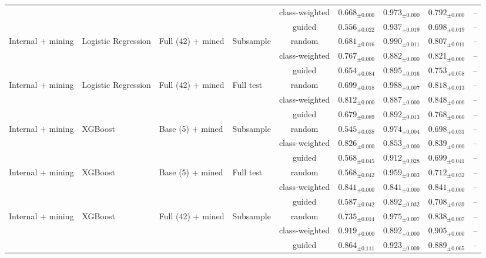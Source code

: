 \begin{longtable}{llllcccc}
 &  &  &  & class-weighted & $0.668_{\pm 0.000}$ & $0.973_{\pm 0.000}$ & $0.792_{\pm 0.000}$ & -- \\
 &  &  &  & guided & $0.556_{\pm 0.022}$ & $0.937_{\pm 0.019}$ & $0.698_{\pm 0.019}$ & -- \\
\addlinespace
Internal + mining & Logistic Regression & Full (42) + mined & Subsample & random & $0.681_{\pm 0.016}$ & $0.990_{\pm 0.011}$ & $0.807_{\pm 0.011}$ & -- \\
 &  &  &  & class-weighted & $0.767_{\pm 0.000}$ & $0.882_{\pm 0.000}$ & $0.821_{\pm 0.000}$ & -- \\
 &  &  &  & guided & $0.654_{\pm 0.084}$ & $0.895_{\pm 0.016}$ & $0.753_{\pm 0.058}$ & -- \\
\addlinespace
Internal + mining & Logistic Regression & Full (42) + mined & Full test & random & $0.699_{\pm 0.018}$ & $0.988_{\pm 0.007}$ & $0.818_{\pm 0.013}$ & -- \\
 &  &  &  & class-weighted & $0.812_{\pm 0.000}$ & $0.887_{\pm 0.000}$ & $0.848_{\pm 0.000}$ & -- \\
 &  &  &  & guided & $0.679_{\pm 0.089}$ & $0.892_{\pm 0.013}$ & $0.768_{\pm 0.060}$ & -- \\
\addlinespace
Internal + mining & XGBoost & Base (5) + mined & Subsample & random & $0.545_{\pm 0.038}$ & $0.974_{\pm 0.004}$ & $0.698_{\pm 0.031}$ & -- \\
 &  &  &  & class-weighted & $0.826_{\pm 0.000}$ & $0.853_{\pm 0.000}$ & $0.839_{\pm 0.000}$ & -- \\
 &  &  &  & guided & $0.568_{\pm 0.045}$ & $0.912_{\pm 0.028}$ & $0.699_{\pm 0.041}$ & -- \\
\addlinespace
Internal + mining & XGBoost & Base (5) + mined & Full test & random & $0.568_{\pm 0.042}$ & $0.959_{\pm 0.003}$ & $0.712_{\pm 0.032}$ & -- \\
 &  &  &  & class-weighted & $0.841_{\pm 0.000}$ & $0.841_{\pm 0.000}$ & $0.841_{\pm 0.000}$ & -- \\
 &  &  &  & guided & $0.587_{\pm 0.042}$ & $0.892_{\pm 0.032}$ & $0.708_{\pm 0.039}$ & -- \\
\addlinespace
Internal + mining & XGBoost & Full (42) + mined & Subsample & random & $0.735_{\pm 0.014}$ & $0.975_{\pm 0.007}$ & $0.838_{\pm 0.007}$ & -- \\
 &  &  &  & class-weighted & $0.919_{\pm 0.000}$ & $0.892_{\pm 0.000}$ & $0.905_{\pm 0.000}$ & -- \\
 &  &  &  & guided & $0.864_{\pm 0.111}$ & $0.923_{\pm 0.009}$ & $0.889_{\pm 0.065}$ & -- \\

\end{longtable}
